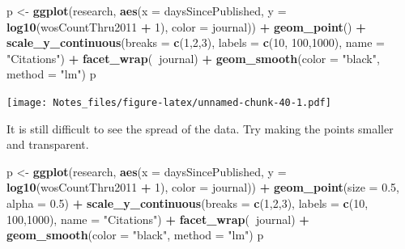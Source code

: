\documentclass[
]{book}
\newenvironment{Shaded}{\begin{snugshade}}{\end{snugshade}}
\newcommand{\DataTypeTok}[1]{\textcolor[rgb]{0.13,0.29,0.53}{#1}}
\newcommand{\DecValTok}[1]{\textcolor[rgb]{0.00,0.00,0.81}{#1}}
\newcommand{\FloatTok}[1]{\textcolor[rgb]{0.00,0.00,0.81}{#1}}
\newcommand{\KeywordTok}[1]{\textcolor[rgb]{0.13,0.29,0.53}{\textbf{#1}}}
\newcommand{\NormalTok}[1]{#1}
\newcommand{\OperatorTok}[1]{\textcolor[rgb]{0.81,0.36,0.00}{\textbf{#1}}}
\newcommand{\StringTok}[1]{\textcolor[rgb]{0.31,0.60,0.02}{#1}}
\begin{document}
\begin{Shaded}
\begin{Highlighting}[]
\NormalTok{p <-}\StringTok{ }\KeywordTok{ggplot}\NormalTok{(research, }\KeywordTok{aes}\NormalTok{(}\DataTypeTok{x =}\NormalTok{ daysSincePublished, }
                          \DataTypeTok{y =} \KeywordTok{log10}\NormalTok{(wosCountThru2011 }\OperatorTok{+}\StringTok{ }\DecValTok{1}\NormalTok{),}
                          \DataTypeTok{color =}\NormalTok{ journal)) }\OperatorTok{+}
\StringTok{  }\KeywordTok{geom_point}\NormalTok{() }\OperatorTok{+}
\StringTok{  }\KeywordTok{scale_y_continuous}\NormalTok{(}\DataTypeTok{breaks =} \KeywordTok{c}\NormalTok{(}\DecValTok{1}\NormalTok{,}\DecValTok{2}\NormalTok{,}\DecValTok{3}\NormalTok{), }\DataTypeTok{labels =} \KeywordTok{c}\NormalTok{(}\DecValTok{10}\NormalTok{, }\DecValTok{100}\NormalTok{,}\DecValTok{1000}\NormalTok{), }\DataTypeTok{name =} \StringTok{"Citations"}\NormalTok{) }\OperatorTok{+}
\StringTok{  }\KeywordTok{facet_wrap}\NormalTok{(}\OperatorTok{~}\NormalTok{journal) }\OperatorTok{+}
\StringTok{  }\KeywordTok{geom_smooth}\NormalTok{(}\DataTypeTok{color =} \StringTok{"black"}\NormalTok{, }\DataTypeTok{method =} \StringTok{"lm"}\NormalTok{)}
\NormalTok{p}
\end{Highlighting}
\end{Shaded}

\texttt{[image: Notes\_files/figure-latex/unnamed-chunk-40-1.pdf]}

It is still difficult to see the spread of the data. Try making the points smaller and transparent.

\begin{Shaded}
\begin{Highlighting}[]
\NormalTok{p <-}\StringTok{ }\KeywordTok{ggplot}\NormalTok{(research, }\KeywordTok{aes}\NormalTok{(}\DataTypeTok{x =}\NormalTok{ daysSincePublished, }
                          \DataTypeTok{y =} \KeywordTok{log10}\NormalTok{(wosCountThru2011 }\OperatorTok{+}\StringTok{ }\DecValTok{1}\NormalTok{),}
                          \DataTypeTok{color =}\NormalTok{ journal)) }\OperatorTok{+}
\StringTok{  }\KeywordTok{geom_point}\NormalTok{(}\DataTypeTok{size =} \FloatTok{0.5}\NormalTok{, }\DataTypeTok{alpha =} \FloatTok{0.5}\NormalTok{) }\OperatorTok{+}
\StringTok{  }\KeywordTok{scale_y_continuous}\NormalTok{(}\DataTypeTok{breaks =} \KeywordTok{c}\NormalTok{(}\DecValTok{1}\NormalTok{,}\DecValTok{2}\NormalTok{,}\DecValTok{3}\NormalTok{), }\DataTypeTok{labels =} \KeywordTok{c}\NormalTok{(}\DecValTok{10}\NormalTok{, }\DecValTok{100}\NormalTok{,}\DecValTok{1000}\NormalTok{), }\DataTypeTok{name =} \StringTok{"Citations"}\NormalTok{) }\OperatorTok{+}
\StringTok{  }\KeywordTok{facet_wrap}\NormalTok{(}\OperatorTok{~}\NormalTok{journal) }\OperatorTok{+}
\StringTok{  }\KeywordTok{geom_smooth}\NormalTok{(}\DataTypeTok{color =} \StringTok{"black"}\NormalTok{, }\DataTypeTok{method =} \StringTok{"lm"}\NormalTok{)}
\NormalTok{p}
\end{Highlighting}
\end{Shaded}
\end{document}
